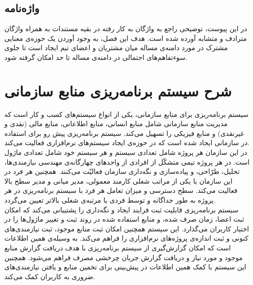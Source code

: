 \subsection{واژه‌نامه}
در این پیوست، توضیحی راجع به واژگان به کار رفته در بقیه مستندات به همراه واژگان مترادف و متشابه آورده شده است. هدف این فصل، به وجود آوردن یک حوزه‌ی معنایی مشترک در مورد دامنه‌ی مساله میان مشتریان و اعضای تیم ایجاد است  تا جلوی سوء‌تفاهم‌های احتمالی در دامنه‌ی مساله تا حد امکان گرفته شود.


\newpage
\section{شرح سیستم برنامه‌ریزی منابع سازمانی}
سیستم برنامه‌ریزی برای منابع سازمانی، یکی از انواع سیستم‌های کسب و کار است که مدیریت منابع سازمانی شامل منابع انسانی، منابع اطلاعاتی، منابع مالی (نقدی و غیرنقدی) و منابع فیزیکی را تسهیل می‌کند. سیستم برنامه‌ریزی پیش رو برای استفاده در سازمانی ایجاد شده است که در حوزه‌ی ایجاد سیستم‌های نرم‌افزاری فعالیت می‌کند. \\
در این سازمان هر پروژه شامل تعدادی سیستم و هر سیستم خود شامل تعدادی ماژول است. در هر پروژه تیمی متشکّل از افرادی از واحدهای چهارگانه‌ی مهندسی نیازمندی‌ها، تحلیل، طرّاحی، و پیاده‌سازی و نگه‌داری سازمان فعالیّت می‌کنند. همچنین هر فرد در این سازمان با یکی از مراتب شغلی کارمند معمولی، مدیر میانی و مدیر سطح بالا فعالیت می‌کند. سطح دسترسی و میزان تعامل هر فرد با سیستم برنامه‌ریزی در هر پروژه به طور جداگانه و توسط فردی با مرتبه‌ی شغلی بالاتر تعیین می‌گردد. \\
سیستم برنامه‌ریزی قابلیت ثبت فرایند ایجاد و نگه‌داری را پشتیبانی می‌کند که امکان ثبت اعضا، زمان صرف شده، و منابع استفاده شده در روند ثبت و تغییر ماژول‌ها را در اختیار کاربران می‌گذارد. این سیستم همچنین امکان ثبت منابع موجود، ثبت نیازمندی‌های کنونی و ثبت اندازه‌ی پروژه‌های نرم‌افزاری را فراهم می‌کند. به وسیله‌ی همین اطلاعات است که امکان گزارش‌گیری از سیستم برنامه‌ریزی با هدف دریافت گزارش منابع موجود و مورد نیاز و دریافت گزارش جریان چرخشی مصرف فراهم می‌شود. همچنین این سیستم با کمک همین اطلاعات در پیش‌بینی برای تخمین منابع و یافتن نیازمندی‌های ضروری به کاربران کمک می‌کند. \\

